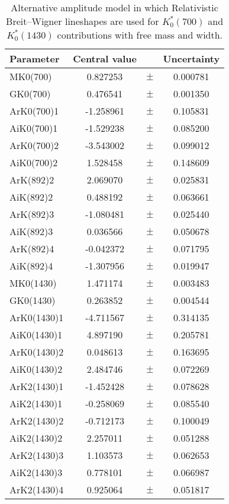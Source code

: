 \clearpage

\begin{table}
\centering
\caption{Alternative amplitude model in which Relativistic Breit--Wigner lineshapes are used for $K^*_0(700)$ and $K^*_0(1430)$ contributions with free mass and width.}
\begin{tiny}
\begin{tabular}{lccc}
\toprule
Parameter & Central value & & Uncertainty\\
\midrule
MK0(700) & 0.827253 & $\pm$ & 0.000781 \\
GK0(700) & 0.476541 & $\pm$ & 0.001350 \\
ArK0(700)1 & -1.258961 & $\pm$ & 0.105831 \\
AiK0(700)1 & -1.529238 & $\pm$ & 0.085200 \\
ArK0(700)2 & -3.543002 & $\pm$ & 0.099012 \\
AiK0(700)2 & 1.528458 & $\pm$ & 0.148609 \\
ArK(892)2 & 2.069070 & $\pm$ & 0.025831 \\
AiK(892)2 & 0.488192 & $\pm$ & 0.063661 \\
ArK(892)3 & -1.080481 & $\pm$ & 0.025440 \\
AiK(892)3 & 0.036566 & $\pm$ & 0.050678 \\
ArK(892)4 & -0.042372 & $\pm$ & 0.071795 \\
AiK(892)4 & -1.307956 & $\pm$ & 0.019947 \\
MK0(1430) & 1.471174 & $\pm$ & 0.003483 \\
GK0(1430) & 0.263852 & $\pm$ & 0.004544 \\
ArK0(1430)1 & -4.711567 & $\pm$ & 0.314135 \\
AiK0(1430)1 & 4.897190 & $\pm$ & 0.205781 \\
ArK0(1430)2 & 0.048613 & $\pm$ & 0.163695 \\
AiK0(1430)2 & 2.484746 & $\pm$ & 0.072269 \\
ArK2(1430)1 & -1.452428 & $\pm$ & 0.078628 \\
AiK2(1430)1 & -0.258069 & $\pm$ & 0.085540 \\
ArK2(1430)2 & -0.712173 & $\pm$ & 0.100049 \\
AiK2(1430)2 & 2.257011 & $\pm$ & 0.051288 \\
ArK2(1430)3 & 1.103573 & $\pm$ & 0.062653 \\
AiK2(1430)3 & 0.778101 & $\pm$ & 0.066987 \\
ArK2(1430)4 & 0.925064 & $\pm$ & 0.051817 \\

\end{tabular}
\end{tiny}
\end{table}
